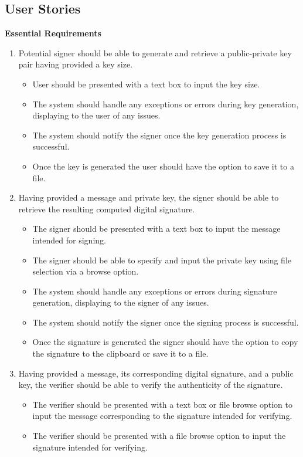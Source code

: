 \documentclass[]{final_report}
\theoremstyle{definition}
\begin{document}
\subsection{User Stories}
\textbf{Essential Requirements}
\begin{enumerate}
\item Potential signer should be able to generate and retrieve a public-private key pair having provided a key size.
\begin{itemize}
\item User should be presented with a text box to input the key size.
\item The system should handle any exceptions or errors during key generation, displaying to the user of any issues.
\item The system should notify the signer once the key generation process is successful.
\item Once the key is generated the user should have the option to save it to a file.
\end{itemize}
\item Having provided a message and private key, the signer should be able to retrieve the resulting computed digital signature.
\begin{itemize}
\item The signer should be presented with a text box to input the message intended for signing.
\item The signer should be able to specify and input the private key using file selection via a browse option.
\item The system should handle any exceptions or errors during signature generation, displaying to the signer of any issues.
\item The system should notify the signer once the signing process is successful.
\item Once the signature is generated the signer should have the option to copy the signature to the clipboard or save it to a file.
\end{itemize}
\item Having provided a message, its corresponding digital signature, and a public key, the verifier should be able to verify the authenticity of the signature.
\begin{itemize}
\item The verifier should be presented with a text box or file browse option to input the message corresponding to the signature intended for verifying.
\item The verifier should be presented with a file browse option to input the signature intended for verifying.

\end{itemize}
\end{enumerate}
\end{document}
